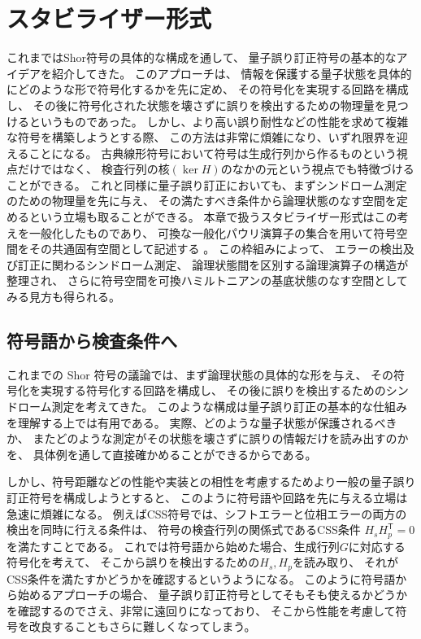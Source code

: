 \documentclass[../master.tex]{subfiles}
\begin{document}
\chapter{スタビライザー形式}
これまではShor符号の具体的な構成を通して、
量子誤り訂正符号の基本的なアイデアを紹介してきた。
このアプローチは、
情報を保護する量子状態を具体的にどのような形で符号化するかを先に定め、
その符号化を実現する回路を構成し、
その後に符号化された状態を壊さずに誤りを検出するための物理量を見つけるというものであった。
しかし、より高い誤り耐性などの性能を求めて複雑な符号を構築しようとする際、
この方法は非常に煩雑になり、いずれ限界を迎えることになる。
古典線形符号において符号は生成行列から作るものという視点だけではなく、
検査行列の核$(\ker H)$のなかの元という視点でも特徴づけることができる。
これと同様に量子誤り訂正においても、まずシンドローム測定のための物理量を先に与え、
その満たすべき条件から論理状態のなす空間を定めるという立場も取ることができる。
本章で扱うスタビライザー形式はこの考えを一般化したものであり、
可換な一般化パウリ演算子の集合を用いて符号空間をその共通固有空間として記述する
\cite{Gottesman1997-ep,Daniel-Gottesman1999-eh,Bullock2007-jl}。
この枠組みによって、
エラーの検出及び訂正に関わるシンドローム測定、
論理状態間を区別する論理演算子の構造が整理され、
さらに符号空間を可換ハミルトニアンの基底状態のなす空間としてみる見方も得られる。

\section{符号語から検査条件へ}
これまでの Shor 符号の議論では、まず論理状態の具体的な形を与え、
その符号化を実現する符号化する回路を構成し、
その後に誤りを検出するためのシンドローム測定を考えてきた。
このような構成は量子誤り訂正の基本的な仕組みを理解する上では有用である。
実際、どのような量子状態が保護されるべきか、
またどのような測定がその状態を壊さずに誤りの情報だけを読み出すのかを、
具体例を通して直接確かめることができるからである。

しかし、符号距離などの性能や実装との相性を考慮するためより一般の量子誤り訂正符号を構成しようとすると、
このように符号語や回路を先に与える立場は急速に煩雑になる。
例えばCSS符号では、シフトエラーと位相エラーの両方の検出を同時に行える条件は、
符号の検査行列の関係式であるCSS条件 $H_sH_p^\mathsf{T}=0$ を満たすことである。
これでは符号語から始めた場合、生成行列$G$に対応する符号化を考えて、
そこから誤りを検出するための$H_s,H_p$を読み取り、
それがCSS条件を満たすかどうかを確認するというようになる。
このように符号語から始めるアプローチの場合、
量子誤り訂正符号としてそもそも使えるかどうかを確認するのでさえ、非常に遠回りになっており、
そこから性能を考慮して符号を改良することもさらに難しくなってしまう。
\end{document}
